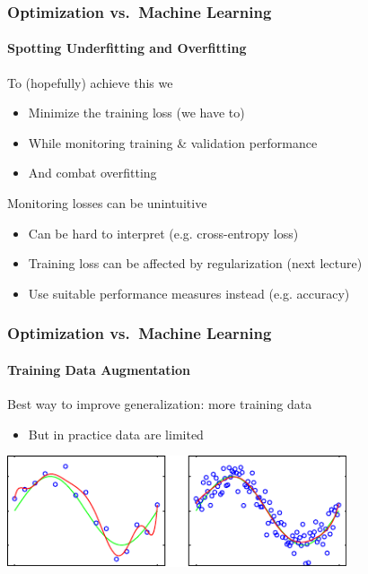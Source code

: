 \documentclass[xetex,professionalfont]{beamer}
\newcommand{\eg}{\mbox{e.g.}\xspace} %
\begin{document}
\begin{frame}
\frametitle{Optimization vs.~Machine Learning}
\framesubtitle{Spotting Underfitting and Overfitting}

To (hopefully) achieve this we
\begin{itemize}
    \item Minimize the training loss (we have to)
    \item While monitoring training \& validation performance
    \item And combat overfitting
\end{itemize}

\bigskip

Monitoring losses can be unintuitive
\begin{itemize}
    \item Can be hard to interpret (\eg cross-entropy loss)
    \item Training loss can be affected by regularization (next lecture)
    \item Use suitable performance measures instead (\eg accuracy)
\end{itemize}

\end{frame}
  
  
  \begin{frame}
    \frametitle{Optimization vs.~Machine Learning}
    \framesubtitle{Training Data Augmentation}

  Best way to improve generalization: more training data
  \begin{itemize}
      \item But in practice data are limited
  \end{itemize}
  
  \bigskip
  
  \begin{center}
  \includegraphics[width=10cm]{images/curves-samples}
  \end{center}
  
  \end{frame}
  
\end{document}
